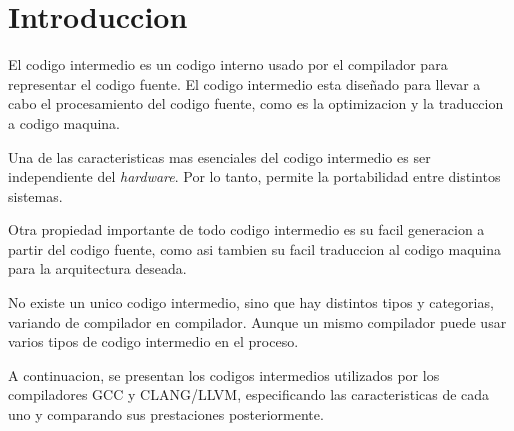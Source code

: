 \chapter{Introduccion}

El codigo intermedio es un codigo interno usado por el compilador para 
representar el codigo fuente. El codigo intermedio esta diseñado para llevar a cabo 
el procesamiento del codigo fuente, como es la optimizacion y la traduccion a codigo maquina. 

Una de las caracteristicas mas esenciales del codigo intermedio es ser 
independiente del \emph{hardware}. Por lo tanto, permite la portabilidad entre distintos 
sistemas.

Otra propiedad importante de todo codigo intermedio es su facil generacion a partir del 
codigo fuente, como asi tambien su facil traduccion al codigo maquina para la arquitectura 
deseada.

No existe un unico codigo intermedio, sino que hay distintos tipos y categorias, variando 
de compilador en compilador. Aunque un mismo compilador puede usar varios tipos de 
codigo intermedio en el proceso.

A continuacion, se presentan los codigos intermedios utilizados por los compiladores 
GCC y CLANG/LLVM, especificando las caracteristicas de cada uno y comparando sus 
prestaciones posteriormente.
